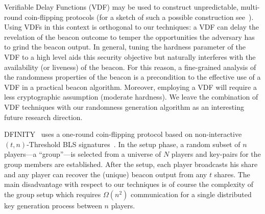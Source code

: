Verifiable Delay Functions (VDF)
\cite{vdf-boneh,vdf-wesolowski,vdf-pietrzak} may be used to construct
unpredictable, multi-round coin-flipping protocols (for a sketch of
such a possible construction see~\cite{vdf-ethereum}). Using VDFs in
this context is orthogonal to our techniques: a VDF can delay the
revelation of the beacon outcome to temper the opportunities the
adversary has to grind the beacon output. In general, tuning the
hardness parameter of the VDF to a high level aids this security
objective but naturally interferes with the availability (or liveness)
of the beacon.
For this reason, a fine-grained analysis of the
randomness properties of the beacon is a precondition to the effective
use of a VDF in a practical beacon algorithm. Moreover, employing a
VDF will require a less cryptographic assumption (moderate hardness).
We leave the combination of VDF techniques with our randomness
generation algorithm as an interesting future research direction.

DFINITY~\cite{Dfinity} uses a one-round coin-flipping protocol based
on non-interactive $(t,n)$-Threshold BLS signatures~\cite{BLS}. 
In the setup phase, a random subset of $n$
players---a ``group''---is selected from a universe of $N$
players  
and 
key-pairs for the group members are established. 
After the setup, 
each player broadcasts his share 
and any player can
recover the (unique) beacon output from any $t$ shares.
%
The main disadvantage with respect to our techniques is of course
the complexity of the group setup which requires $\Omega(n^2)$ communication
for a single distributed key generation process between $n$ players.



